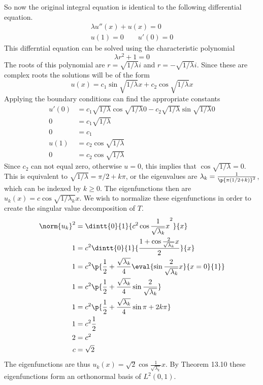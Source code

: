 \documentclass[11pt, oneside]{article}
\begin{document}
\begin{enumerate}
    So now the original integral equation is identical to the following
    differential equation.
    \begin{align*}
      \lambda u''(x) + u(x) = 0 \\
      u(1) = 0 \qquad u'(0) = 0
    \end{align*}
    This differntial equation can be solved using the characteristic polynomial
    \[
      \lambda r^2 + 1 = 0
    \]
    The roots of this polynomial are $r = \sqrt{1/\lambda} i$ and
    $r = -\sqrt{1/\lambda} i$.
    Since these are complex roots the solutions will be of the form
    \[
      u(x) = c_1 \sin{\sqrt{1/\lambda} x} + c_2 \cos{\sqrt{1/\lambda} x}
    \]
    Applying the boundary conditions can find the appropriate constants
    \begin{align*}
      u'(0) &= c_1 \sqrt{1/\lambda} \cos{\sqrt{1/\lambda} 0} - c_2 \sqrt{1/\lambda} \sin{\sqrt{1/\lambda} 0} \\
      0 &= c_1 \sqrt{1/\lambda} \\
      0 &= c_1 \\
      u(1) &= c_2 \cos{\sqrt{1/\lambda}} \\
      0 &= c_2 \cos{\sqrt{1/\lambda}}
    \end{align*}
    Since $c_2$ can not equal zero, otherwise $u = 0$, this implies that
    $\cos{\sqrt{1/\lambda}} = 0$.
    This is equivalent to $\sqrt{1/\lambda} = \pi/2 + k\pi$, or the eigenvalues
    are $\lambda_k = \frac{1}{\p{\pi(1/2 + k)}^2}$, which can be indexed by
    $k \ge 0$.
    The eigenfunctions then are $u_k(x) = c \cos{\sqrt{1/\lambda_k} x}$.
    We wish to normalize these eigenfunctions in order to create the singular
    value decomposition of $T$.
    \begin{align*}
      \norm{u_k}^2 &= \dintt{0}{1}{c^2 \cos{\frac{1}{\sqrt{\lambda_k}} x}^2}{x} \\
      1 &= c^2 \dintt{0}{1}{\frac{1 + \cos{\frac{2}{\sqrt{\lambda_k}} x}}{2}}{x} \\
      1 &= c^2 \p{\frac{1}{2} + \frac{\sqrt{\lambda_k}}{4} \eval{\sin{\frac{2}{\sqrt{\lambda_k}} x}}{x = 0}{1}} \\
      1 &= c^2 \p{\frac{1}{2} + \frac{\sqrt{\lambda_k}}{4} \sin{\frac{2}{\sqrt{\lambda_k}}}} \\
      1 &= c^2 \p{\frac{1}{2} + \frac{\sqrt{\lambda_k}}{4} \sin{\pi + 2k\pi}} \\
      1 &= c^2 \frac{1}{2} \\
      2 &= c^2 \\
      c &= \sqrt{2}
    \end{align*}
    The eigenfunctions are thus $u_k(x) = \sqrt{2} \cos{\frac{1}{\sqrt{\lambda_k}} x}$.
    By Theorem 13.10 these eigenfunctions form an orthonormal basis of $L^2(0, 1)$.


\end{enumerate}
\end{document}
